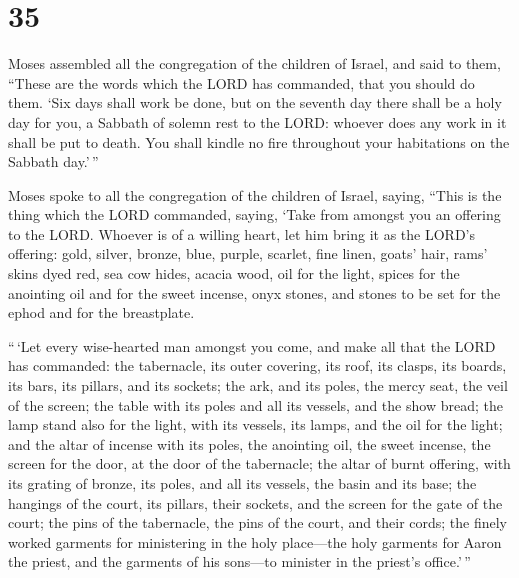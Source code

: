 \hypertarget{section-34}{%
\section{35}\label{section-34}}

 Moses assembled all the congregation of the children of
Israel, and said to them, ``These are the words which the LORD has
commanded, that you should do them.  `Six days shall work be
done, but on the seventh day there shall be a holy day for you, a
Sabbath of solemn rest to the LORD: whoever does any work in it shall be
put to death.  You shall kindle no fire throughout your
habitations on the Sabbath day.'\,''

 Moses spoke to all the congregation of the children of
Israel, saying, ``This is the thing which the LORD commanded, saying,
 `Take from amongst you an offering to the LORD. Whoever is
of a willing heart, let him bring it as the LORD's offering: gold,
silver, bronze,  blue, purple, scarlet, fine linen, goats'
hair,  rams' skins dyed red, sea cow hides, acacia wood,
 oil for the light, spices for the anointing oil and for the
sweet incense,  onyx stones, and stones to be set for the
ephod and for the breastplate.

 ``\,`Let every wise-hearted man amongst you come, and make
all that the LORD has commanded:  the tabernacle, its outer
covering, its roof, its clasps, its boards, its bars, its pillars, and
its sockets;  the ark, and its poles, the mercy seat, the
veil of the screen;  the table with its poles and all its
vessels, and the show bread;  the lamp stand also for the
light, with its vessels, its lamps, and the oil for the light;
 and the altar of incense with its poles, the anointing
oil, the sweet incense, the screen for the door, at the door of the
tabernacle;  the altar of burnt offering, with its grating
of bronze, its poles, and all its vessels, the basin and its base;
 the hangings of the court, its pillars, their sockets, and
the screen for the gate of the court;  the pins of the
tabernacle, the pins of the court, and their cords;  the
finely worked garments for ministering in the holy place---the holy
garments for Aaron the priest, and the garments of his sons---to
minister in the priest's office.'\,''

